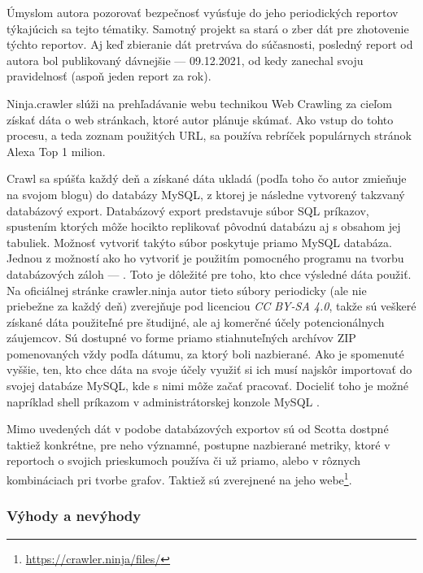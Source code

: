 Úmyslom autora pozorovať bezpečnosť vyúsťuje do jeho periodických reportov týkajúcich sa tejto tématiky. 
Samotný projekt sa stará o zber dát pre zhotovenie týchto reportov.
Aj keď zbieranie dát pretrváva do súčasnosti, posledný report od autora bol publikovaný dávnejšie --- 09.12.2021, od kedy zanechal svoju pravidelnosť (aspoň jeden report za rok).

Ninja.crawler slúži na prehľadávanie webu technikou Web Crawling za cieľom získať dáta o web stránkach, ktoré autor plánuje skúmať.
Ako vstup do tohto procesu, a teda zoznam použitých URL, sa používa rebríček populárnych stránok Alexa Top 1 milion.

Crawl sa spúšťa každý deň a získané dáta ukladá (podľa toho čo autor zmieňuje na svojom blogu) do databázy MySQL, z ktorej je následne vytvorený takzvaný databázový export.
Databázový export predstavuje súbor SQL príkazov, spustením ktorých môže hocikto replikovať pôvodnú databázu aj s obsahom jej tabuliek. 
Možnosť vytvoriť takýto súbor poskytuje priamo MySQL databáza. 
Jednou z možností ako ho vytvoriť je použitím pomocného programu na tvorbu databázových záloh ---  \cite{mysql-doc}.
Toto je dôležité pre toho, kto chce výsledné dáta použiť. 
Na oficiálnej stránke crawler.ninja autor tieto súbory periodicky (ale nie priebežne za každý deň) zverejňuje pod licenciou \textit{CC BY-SA 4.0}, takže sú veškeré získané dáta použiteľné pre študijné, ale aj komerčné účely potencionálnych záujemcov.
Sú dostupné vo forme priamo stiahnuteľných archívov ZIP pomenovaných vždy podľa dátumu, za ktorý boli nazbierané.
Ako je spomenuté vyššie, ten, kto chce dáta na svoje účely využiť si ich musí najskôr importovať do svojej databáze MySQL, kde s nimi môže začať pracovať.
Docieliť toho je možné napríklad shell príkazom  v administrátorskej konzole MySQL \cite{mysql-doc}.

Mimo uvedených dát v podobe databázových exportov sú od Scotta dostpné taktiež konkrétne, pre neho významné, postupne nazbierané metriky, ktoré v reportoch o svojich prieskumoch používa či už priamo, alebo v rôznych kombináciach pri tvorbe grafov. Taktiež sú zverejnené na jeho webe\footnote{\href{https://crawler.ninja/files/}{https://crawler.ninja/files/}}.

\subsubsection{Výhody a nevýhody}



